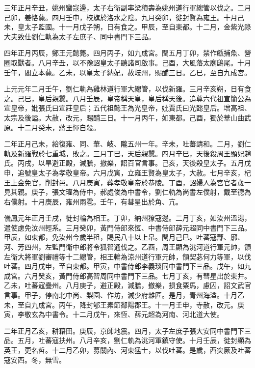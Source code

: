 \begin{pinyinscope}
 三年正月辛丑，姚州蠻寇邊，太子右衛副率梁積壽為姚州道行軍總管以伐之。二月己卯，姜恪薨。四月壬申，校旗於洛水之陰。九月癸卯，徙封賢為雍王。十月己未，皇太子監國。十一月戊子朔，日有食之。甲辰，至自東都。十二月，金紫光祿大夫致仕劉仁軌為太子左庶子、同中書門下三品。



 四年正月丙辰，鄭王元懿薨。四月丙子，如九成宮。閏五月丁卯，禁作甗捕魚、營圈取獸者。八月辛丑，以不豫詔皇太子聽諸司啟事。己酉，大風落太廟鴟尾。十月壬午，閻立本薨。乙未，以皇太子納妃，赦岐州，賜酺三日。乙巳，至自九成宮。



 上元元年二月壬午，劉仁軌為雞林道行軍大總管，以伐新羅。三月辛亥朔，日有食之。己巳，皇后親蠶。八月壬辰，皇帝稱天皇，皇后稱天後。追尊六代祖宣簡公為宣皇帝，妣張氏曰宣莊皇后；五代祖懿王為光皇帝，妣賈氏曰光懿皇后。增高祖、太宗及後謚。大赦，改元，賜酺三日。十一月丙午，如東都。己酉，獨於華山曲武原。十二月癸未，蔣王惲自殺。



 二年正月己未，給復雍、同、華、岐、隴五州一年。辛未，吐蕃請和。二月，劉仁軌及新羅戰於七重城，敗之。三月丁巳，天后親蠶。四月辛巳，天後殺周王顯妃趙氏。丙戌，以旱避正殿，減膳，撤樂，詔百官言事。己亥，天後殺皇太子。五月戊申，追號皇太子為孝敬皇帝。六月戊寅，立雍王賢為皇太子，大赦。七月辛亥，杞王上金免官，削封邑。八月庚寅，葬孝敬皇帝於恭陵。丁酉，詔婦人為宮官者歲一見其親。庚子，張文瓘為侍中，郝處俊為中書令，劉仁軌為尚書左僕射，戴至德為右僕射。十月庚辰，雍州雨雹。壬午，有彗星出於角、亢。



 儀鳳元年正月壬戌，徙封輪為相王。丁卯，納州獠寇邊。二月丁亥，如汝州溫湯，遣使慮免汝州輕系。三月癸卯，黃門侍郎來恆、中書侍郎薛元超同中書門下三品。甲辰，如東都，免汝州今歲半租，賜民八十以上帛。閏月己巳。吐蕃寇鄯、廓、河、芳四州，左監門衛中郎將令狐智通伐之。乙酉，周王顯為洮河道行軍元帥，領左衛大將軍劉審禮等十二總管，相王輪為涼州道行軍元帥，領契苾何力等軍，以伐吐蕃。四月戊申，至自東都。甲寅，中書侍郎李義琰同中書門下三品。戊午，如九成宮。六月癸亥，黃門侍郎高智周同中書門下三品。七月丁亥，有彗星出於東井。乙未，吐蕃寇疊州。八月庚子，避正殿，減膳，撤樂，損食粟馬，慮囚，詔文武官言事。甲子，停南北中尚、梨園、作坊，減少府雜匠。是月，青州海溢。十月乙未，至自九成宮。丙午，降封郇王素節鄱陽郡王。十一月壬申，寺赦，改元。庚寅，李敬玄為中書令。十二月戊午，來恆、薛元超為河南、河北道大使。



 二年正月乙亥，耕藉田。庚辰，京師地震。四月，太子左庶子張大安同中書門下三品。五月，吐蕃寇扶州。八月辛亥，劉仁軌為洮河軍鎮守使。十月壬辰，徙封顯為英王，更名哲。十二月乙卯，募關內、河東猛士，以伐吐蕃。是歲，西突厥及吐蕃寇安西。冬，無雪。




\end{pinyinscope}
